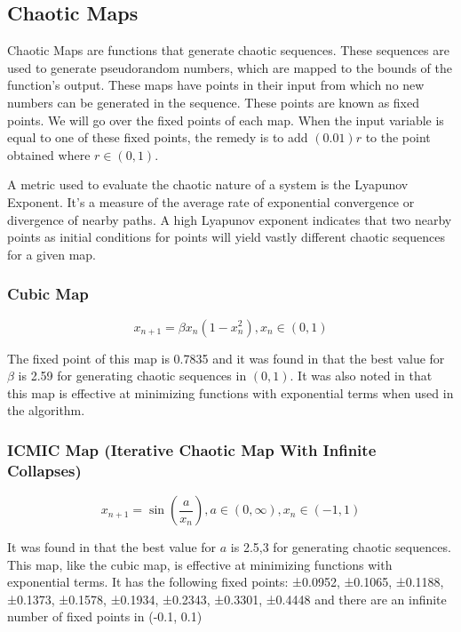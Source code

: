 \documentclass[conference]{IEEEtran}
\begin{document}
\subsection{Chaotic Maps}

Chaotic Maps are functions that generate chaotic sequences. These sequences are used to generate pseudorandom numbers, which are mapped to the bounds of the function's output. These maps have points in their input from which no new numbers can be generated in the sequence. These points are known as fixed points. We will go over the fixed points of each map. When the input variable is equal to one of these fixed points, the remedy is to add $(0.01)r$ to the point obtained where $r \in (0,1)$.

A metric used to evaluate the chaotic nature of a system is the Lyapunov Exponent. It's a measure of the average rate of exponential convergence or divergence of nearby paths. A high Lyapunov exponent indicates that two nearby points as initial conditions for points will yield vastly different chaotic sequences for a given map.

\subsubsection{Cubic Map}
\[x_{n+1} = \beta x_n (1 - x_n^2), x_n \in (0,1)\]

The fixed point of this map is 0.7835 and it was found in \cite{raniAnalysisChaoticMaps2023} that the best value for $\beta$ is 2.59 for generating chaotic sequences in $(0,1)$. It was also noted in \cite{raniAnalysisChaoticMaps2023} that this map is effective at minimizing functions with exponential terms when used in the algorithm.

\subsubsection{ICMIC Map (Iterative Chaotic Map With Infinite Collapses)}

\[x_{n+1} = \sin{(\frac{a}{x_n})}, a \in (0, \infty), x_n \in (-1,1)\]

It was found in \cite{raniAnalysisChaoticMaps2023} that the best value for $a$ is 2.5,3 for generating chaotic sequences. This map, like the cubic map, is effective at minimizing functions with exponential terms.
It has the following fixed points:
±0.0952, ±0.1065, ±0.1188, ±0.1373, ±0.1578, ±0.1934, ±0.2343, ±0.3301, ±0.4448 and there are an infinite number of fixed points in (-0.1, 0.1)
\end{document}
